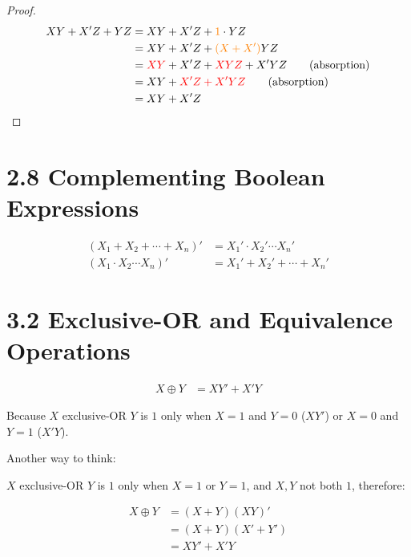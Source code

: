 \documentclass{article}
\begin{document}
\begin{proof}
    \begin{align*}
        XY + X'Z + YZ 
        &= XY + X'Z + \textcolor{orange}{1} \cdot YZ \\
        &= XY + X'Z + \textcolor{orange}{(X + X')}YZ \\
        &= \textcolor{red}{XY} + X'Z + \textcolor{red}{XYZ}+ X'YZ \qquad \text{(absorption)}\\
        &= XY + \textcolor{red}{X'Z + X'YZ} \qquad \text{(absorption)}\\
        &= XY + X'Z
    \end{align*}
\end{proof}

\section*{2.8 Complementing Boolean Expressions}

\begin{tcolorbox}[greenbox]
    {
    \begin{align*}
        (X_1 + X_2 + \cdots + X_n)' &= X_1' \cdot X_2' \cdots X_n' \\
        (X_1 \cdot X_2 \cdots X_n)' &= X_1' + X_2' + \cdots + X_n'
    \end{align*}
    }
\end{tcolorbox}

\section*{3.2 Exclusive-OR and Equivalence Operations}

\begin{tcolorbox}[greenbox, title=Exclusive-OR, coltitle=black]
    {
    \begin{align*}
        X \oplus Y &= XY' + X'Y
    \end{align*}
    }
\end{tcolorbox}

Because $X$ exclusive-OR $Y$ is $1$ only when $X = 1$ and $Y = 0$ ($XY'$) or $X = 0$ and $Y = 1$ ($X'Y$).
\bigskip

Another way to think:

$X$ exclusive-OR $Y$ is $1$ only when $X = 1$ or $Y = 1$, and $X, Y$ not both $1$, therefore:

\begin{align*}
    X \oplus Y 
    &= (X + Y)(XY)' \\
    &= (X + Y)(X' + Y') \\
    &= XY' + X'Y
\end{align*}
\end{document}
